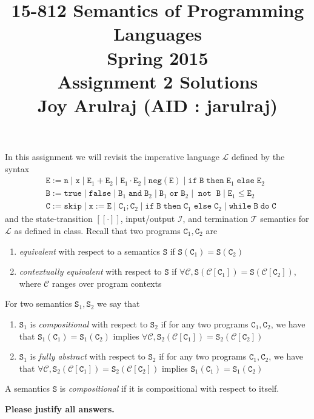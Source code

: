 \documentclass{article}
\newcommand{\E}{\mathtt{E}}
\newcommand{\B}{\mathtt{B}}
\newcommand{\C}{\mathtt{C}}
\newcommand{\true}{\mathtt{true}}
\newcommand{\false}{\mathtt{false}}
\newcommand{\andsym}{\mathtt{and}}
\newcommand{\orsym}{\mathtt{or}}
\newcommand{\notsym}{\mathop{\mathtt{not}}}
\newcommand{\ifsym}{\mathtt{if}}
\newcommand{\then}{\mathtt{then}}
\newcommand{\elsesym}{\mathtt{else}}
\newcommand{\whilesym}{\mathtt{while}}
\newcommand{\dosym}{\mathtt{do}}
\newcommand{\skipsym}{\mathtt{skip}}
\newcommand{\negation}{\mathtt{neg}}
\newcommand{\Sem}{\mathtt{S}}
\newcommand{\question}[1]
{\color{DarkBlue}#1 \color{Black}}
\begin{document}
\title{\textbf{15-812 Semantics of Programming Languages \\ Spring 2015 \\
{\large Assignment 2 Solutions}}\\\vspace{0.3in}
{\Large \bf Joy Arulraj (AID : jarulraj)}}

\date{}
\author{}

\maketitle

\question{
\noindent In this assignment we will revisit the imperative language $\mathcal{L}$ defined by the syntax
\begin{align*}
& \E := \mathtt{n} \; | \; \mathtt{x} \; | \; \E_1 + \E_2 \; | \; \E_1 \cdot \E_2 \; | \; \negation(\E) \; | \; \ifsym \; \B \; \then \; \E_1 \; \elsesym \; \E_2 \\ 
& \B := \true \; | \; \false \; | \; \B_1 \; \andsym \; \B_2 \; | \; \B_1 \; \orsym \; \B_2 \; | \; \notsym \; \B \; | \; \E_1 \leq \E_2 \\
& \C := \skipsym \; | \; \mathtt{x} := \E \; | \; \C_1 ; \C_2 \; | \; \ifsym \; \B \; \then \; \C_1 \; \elsesym \; \C_2 \; | \; \whilesym \; \B \; \dosym \; \C
\end{align*}
and the state-transition $[[\cdot]]$, input/output $\mathcal{I}$, and termination $\mathcal{T}$ semantics for $\mathcal{L}$ as defined in class. Recall that two programs $\C_1, \C_2$ are 
\begin{enumerate}
\item \emph{equivalent} with respect to a semantics $\Sem$ if $\Sem(\C_1) = \Sem(\C_2)$
\item \emph{contextually equivalent} with respect to $\Sem$ if $\forall \mathcal{C}, \Sem(\mathcal{C}[\C_1]) = \Sem(\mathcal{C}[\C_2])$, where $\mathcal{C}$ ranges over program contexts
\end{enumerate}
For two semantics $\Sem_1, \Sem_2$ we say that
\begin{enumerate}
	\item $\Sem_1$ is \emph{compositional} with respect to $\Sem_2$ if for any two programs $\C_1,\C_2$, we have that $\Sem_1(\C_1) = \Sem_1(\C_2)$ implies $\forall \mathcal{C}, \Sem_2(\mathcal{C}[\C_1]) = \Sem_2(\mathcal{C}[\C_2])$
	\item $\Sem_1$ is \emph{fully abstract} with respect to $\Sem_2$ if for any two programs $\C_1,\C_2$, we have that $\forall \mathcal{C}, \Sem_2(\mathcal{C}[\C_1]) = \Sem_2(\mathcal{C}[\C_2])$ implies $\Sem_1(\C_1) = \Sem_1(\C_2)$
	\end{enumerate}
	A semantics $\Sem$ is \emph{compositional} if it is compositional with respect to itself.\bigskip

\noindent \textbf{Please justify all answers.}
}
\end{document}
